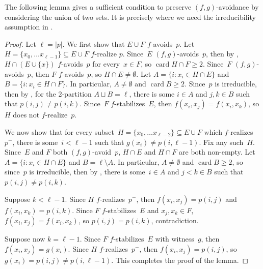 \documentclass{article}
\newcommand{\NN}[0]{\mathbb{N}}
\newcommand{\card}{\operatorname{card}}
\def\NN{\mathbb{N}}
\numberwithin{theorem}{section}
\newtheorem{lemma}[theorem]{Lemma}
\theoremstyle{definition}
\begin{document}
The following lemma gives a sufficient condition to preserve $(f, g)$-avoidance by considering the union of two sets.
It is precisely where we need the irreducibility assumption in .


\begin{proof}
Let $\ell = |p|$. 
We first show that $E \cup F$ $f$-avoids~$p$.
Let $H = \{ x_0, \dots x_{\ell-1} \}\subseteq E \cup F$ $f$-realize $p$. 
Since~$E$ $(f, g)$-avoids~$p$, then by , $H \cap (E \cup \{x\})$ $f$-avoids~$p$ for every~$x \in F$, so $\card H \cap F \geq 2$.
Since~$F$ $(f, g)$-avoids~$p$, then $F$ $f$-avoids~$p$, so $H \cap E \neq \emptyset$.
Let $A = \{ i : x_i \in H \cap E \}$ and $B = \{ i : x_i \in H \cap F \}$. In particular, $A \neq \emptyset$ and $\card B \geq 2$. Since~$p$ is irreducible, then by , for the 2-partition $A \sqcup B = \ell$, there is some $i \in A$ and $j, k \in B$ such that $p(i, j) \neq p(i, k)$. Since~$F$ $f$-stabilizes~$E$, then $f(x_i, x_j) = f(x_i, x_k)$, so $H$ does not $f$-realize~$p$.

We now show that for every subset~$H = \{  x_0, \dots x_{\ell-2} \} \subseteq E \cup F$ which $f$-realizes~$p^-$, there is some~$i < \ell-1$ such that $g(x_i) \neq p(i, \ell-1)$. Fix any such~$H$.
Since~$E$ and $F$ both $(f, g)$-avoid~$p$, $H \cap E$ and $H \cap F$ are both non-empty.
Let $A = \{ i : x_i \in H \cap E \}$ and $B = \ell \setminus A$.
In particular, $A \neq \emptyset$ and $\card B \geq 2$, so since~$p$ is irreducible, then by , there is some~$i \in A$
and $j < k \in B$ such that $p(i, j) \neq p(i, k)$. 

Suppose $k < \ell-1$. Since $H$ $f$-realizes~$p^-$, then $f(x_i, x_j) = p(i, j)$ and $f(x_i, x_k) = p(i, k)$.
Since $F$ $f$-stabilizes~$E$ and $x_j, x_k \in F$, $f(x_i, x_j) = f(x_i, x_k)$, so $p(i, j) = p(i, k)$, contradiction.

Suppose now $k = \ell-1$. Since $F$ $f$-stabilizes~$E$ with witness~$g$, then $f(x_i, x_j) = g(x_i)$.
Since $H$ $f$-realizes~$p^-$, then $f(x_i, x_j) = p(i, j)$, so $g(x_i) = p(i, j) \neq p(i, \ell-1)$.
This completes the proof of the lemma.
\end{proof}
\end{document}
